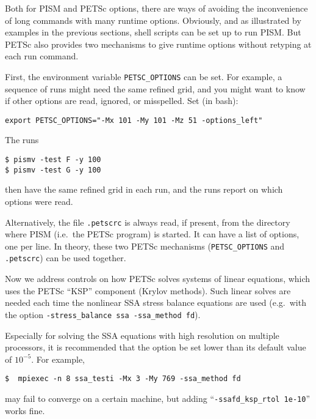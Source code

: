 Both for PISM and PETSc options, there are ways of avoiding the inconvenience of long commands with many runtime options.  Obviously, and as illustrated by examples in the previous sections, shell scripts can be set up to run PISM.  But PETSc also provides two mechanisms to give runtime options without retyping at each run command.

First, the environment variable \texttt{PETSC_OPTIONS} can be set.  For example, a sequence of runs might need the same refined grid, and you might want to know if other options are read, ignored, or misspelled.  Set (in bash):

\texttt{export PETSC_OPTIONS="-Mx 101 -My 101 -Mz 51 -options_left"}

\noindent The runs 
\begin{verbatim}
$ pismv -test F -y 100
$ pismv -test G -y 100
\end{verbatim}
\noindent then have the same refined grid in each run, and the runs report on which options were read.

Alternatively, the file \texttt{.petscrc} is always read, if present, from the directory where PISM (i.e.~the PETSc program) is started.  It can have a list of options, one per line.   In theory, these two PETSc mechanisms (\verb|PETSC_OPTIONS| and \verb|.petscrc|) can be used together.


Now we address controls on how PETSc solves systems of linear equations, which uses the PETSc ``KSP'' component (Krylov methods).  Such linear solves are needed each time the nonlinear SSA stress balance equations are used (e.g.~with the option \texttt{-stress_balance ssa -ssa_method fd}).

Especially for solving the SSA equations with high resolution on multiple processors, it is recommended that the option  be set lower than its default value of $10^{-5}$.  For example, 

\begin{verbatim}
$  mpiexec -n 8 ssa_testi -Mx 3 -My 769 -ssa_method fd
\end{verbatim}

\noindent may fail to converge on a certain machine, but adding ``\verb|-ssafd_ksp_rtol 1e-10|'' works fine.

